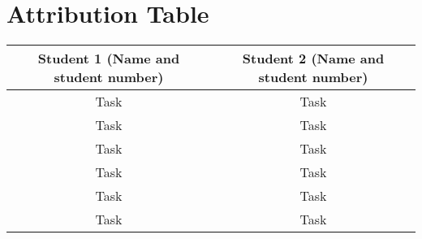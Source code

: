\documentclass{article}
\begin{document}
\section{Attribution Table}

\begin{center}
\begin{tabular}{|| c | c ||}
\hline
 Student 1 (Name and student number) &  Student 2 (Name and student number) \\ 
 \hline
 Task & Task\\
 \hline
 Task & Task\\
 \hline
 Task & Task\\ 
 \hline
 Task & Task\\ 
 \hline
 Task & Task\\
 \hline
 Task & Task\\  
 \hline
\end{tabular}
\end{center}

\end{document}
